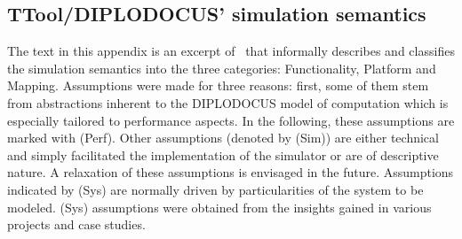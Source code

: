 \documentclass{llncs}
\begin{document}
\begin{subappendices}
\section{TTool/DIPLODOCUS' simulation semantics}
\label{app:SimuSemantics}
%
The text in this appendix is an excerpt of~\cite{Knorreck11} that informally describes and classifies the simulation
semantics into the three categories: Functionality, Platform and Mapping. Assumptions were made for three reasons:
first, some of them stem from abstractions inherent to the DIPLODOCUS model of computation which is especially tailored
to performance aspects. In the following, these assumptions are marked with (Perf). Other assumptions (denoted by (Sim))
are either technical and simply facilitated the implementation of the simulator or are of descriptive nature. A
relaxation of these assumptions is envisaged in the future. Assumptions indicated by (Sys) are normally driven by
particularities of the system to be modeled. (Sys) assumptions were obtained from the insights gained in various
projects and case studies.


\end{subappendices}
\end{document}
